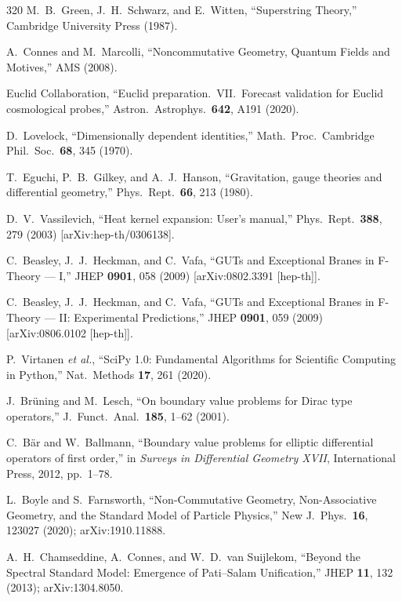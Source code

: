 \begin{thebibliography}{320}
M.~B.~Green, J.~H.~Schwarz, and E.~Witten,
``Superstring Theory,''
Cambridge University Press (1987).

A.~Connes and M.~Marcolli,
``Noncommutative Geometry, Quantum Fields and Motives,''
AMS (2008).

Euclid Collaboration,
``Euclid preparation.\ VII.\ Forecast validation for Euclid cosmological probes,''
Astron.\ Astrophys.\ \textbf{642}, A191 (2020).

D.~Lovelock,
``Dimensionally dependent identities,''
Math.\ Proc.\ Cambridge Phil.\ Soc.\ \textbf{68}, 345 (1970).

T.~Eguchi, P.~B.~Gilkey, and A.~J.~Hanson,
``Gravitation, gauge theories and differential geometry,''
Phys.\ Rept.\ \textbf{66}, 213 (1980).

D.~V.~Vassilevich,
``Heat kernel expansion: User's manual,''
Phys.\ Rept.\ \textbf{388}, 279 (2003)
[arXiv:hep-th/0306138].

C.~Beasley, J.~J.~Heckman, and C.~Vafa,
``GUTs and Exceptional Branes in F-Theory --- I,''
JHEP \textbf{0901}, 058 (2009)
[arXiv:0802.3391 [hep-th]].

C.~Beasley, J.~J.~Heckman, and C.~Vafa,
``GUTs and Exceptional Branes in F-Theory --- II: Experimental Predictions,''
JHEP \textbf{0901}, 059 (2009)
[arXiv:0806.0102 [hep-th]].

P.~Virtanen \emph{et al.},
``SciPy 1.0: Fundamental Algorithms for Scientific Computing in Python,''
Nat.\ Methods \textbf{17}, 261 (2020).

J.~Br\"uning and M.~Lesch,
``On boundary value problems for Dirac type operators,''
J.\ Funct.\ Anal.\ \textbf{185}, 1--62 (2001).

C.~B\"ar and W.~Ballmann,
``Boundary value problems for elliptic differential operators of first order,''
in \emph{Surveys in Differential Geometry XVII},
International Press, 2012, pp.~1--78.

L.~Boyle and S.~Farnsworth,
``Non-Commutative Geometry, Non-Associative Geometry, and the Standard Model of Particle Physics,''
New J.\ Phys.\ \textbf{16}, 123027 (2020);
arXiv:1910.11888.

A.~H.~Chamseddine, A.~Connes, and W.~D.~van Suijlekom,
``Beyond the Spectral Standard Model: Emergence of Pati--Salam Unification,''
JHEP \textbf{11}, 132 (2013);
arXiv:1304.8050.


\end{thebibliography}
